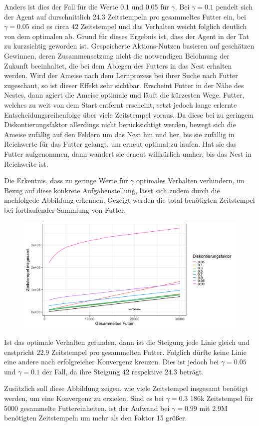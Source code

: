 \par 
Anders ist dies der Fall für die Werte 0.1 und 0.05 für $\gamma$. Bei $\gamma = 0.1$ pendelt sich der Agent auf durschnittlich 24.3 Zeitstempeln pro gesammeltes Futter ein, bei $\gamma = 0.05$ sind es circa $42$ Zeitstempel und das Verhalten weicht folglich deutlich von dem optimalen ab. Grund für dieses Ergebnis ist, dass der Agent in der Tat zu \glqq kurzsichtig\grqq{} geworden ist. Gespeicherte Aktions-Nutzen basieren auf geschätzen Gewinnen, deren Zusammensetzung nicht die notwendigen Belohnung der Zukunft beeinhaltet, die bei dem Ablegen des Futters in das Nest erhalten werden. Wird der Ameise nach dem Lernprozess bei ihrer Suche nach Futter zugeschaut, so ist dieser Effekt sehr sichtbar. Erscheint Futter in der Nähe des Nestes, dann agiert die Ameise optimale und läuft die kürzesten Wege. Futter, welches zu weit von dem Start entfernt erscheint, setzt jedoch lange erlernte Entscheidungsreihenfolge über viele Zeitstempel voraus. Da diese bei zu geringem Diskontierungsfaktor allerdings nicht berücksichtigt werden, bewegt sich die Ameise zufällig auf den Feldern um das Nest hin und her, bis sie zufällig in Reichwerte für das Futter gelangt, um erneut optimal zu laufen. Hat sie das Futter aufgenommen, dann wandert sie erneut willkürlich umher, bis das Nest in Reichweite ist.
\par 
Die Erkentnis, dass zu geringe Werte für $\gamma$ optimales Verhalten verhindern, im Bezug auf diese konkrete Aufgabenstellung, lässt sich zudem durch die nachfolgede Abbildung erkennen. Gezeigt werden die total benötigten Zeitstempel bei fortlaufender Sammlung von Futter.
\begin{figure}[H]
    \centering
    \includegraphics[width=\textwidth]{images/optDiscTotalTS}
    \label{fig:test1}
\end{figure}
Ist das optimale Verhalten gefunden, dann ist die Steigung jede Linie gleich und enstpricht $22.9$ Zeitstempel pro gesammelten Futter. Folglich dürfte keine Linie eine andere nach erfolgreicher Konvergenz kreuzen. Dies ist jedoch bei $\gamma = 0.05$ und $\gamma = 0.1$ der Fall, da ihre Steigung $42$ respektive $24.3$ beträgt.
\par 
Zusätzlich soll diese Abbildung zeigen, wie viele Zeitstempel insgesamt benötigt werden, um eine Konvergenz zu erzielen. Sind es bei $\gamma = 0.3$ 186k Zeitstempel für 5000 gesammelte Futtereinheiten, ist der Aufwand bei $\gamma = 0.99$ mit 2.9M benötigten Zeitstempeln um mehr als den Faktor 15 größer.

